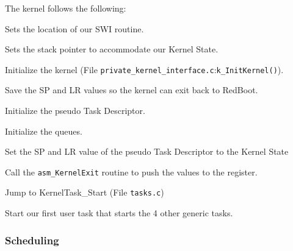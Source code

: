 \documentclass[letterpaper,12pt]{article}
\begin{document}
The kernel follows the following:
\begin{list}{.}
{
\setlength{\rightmargin}{\leftmargin}
}

\item Sets the location of our SWI routine.

\item Sets the stack pointer to accommodate our Kernel State.

\item Initialize the kernel (File \texttt{private\_kernel\_interface.c}:\texttt{k\_InitKernel()}).
\begin{list}{.}
{
\setlength{\rightmargin}{\leftmargin}
}

\item Save the SP and LR values so the kernel can exit back to RedBoot.

\item Initialize the pseudo Task Descriptor.

\item Initialize the queues.

\item Set the SP and LR value of the pseudo Task Descriptor to the Kernel State

\item Call the \texttt{asm\_KernelExit} routine to push the values to the register.
\end{list}

\item Jump to KernelTask\_Start (File \texttt{tasks.c})

\item Start our first user task that starts the 4 other generic tasks.
\end{list}


\subsubsection{Scheduling%
  \label{scheduling}%
}
\end{document}

